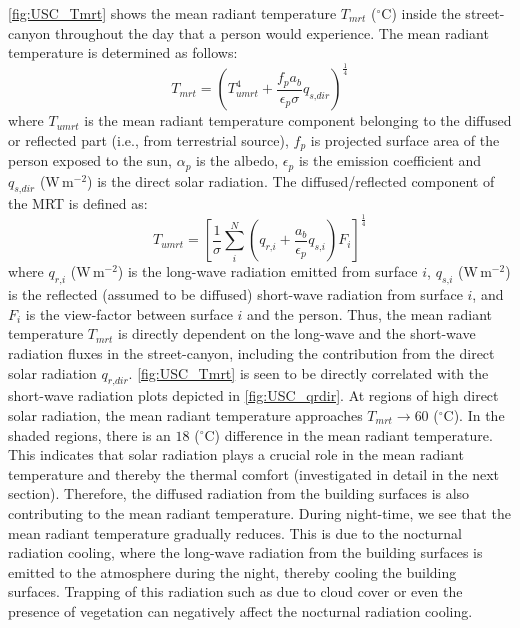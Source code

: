 \cref{fig:USC_Tmrt} shows the mean radiant temperature $T_{\textit{mrt}}$  ($^{\circ}$C) inside the street-canyon throughout the day that a person would experience.  The mean radiant temperature is determined as follows: 
\begin{equation}
T_{\textit{mrt}} = \left( T_{\textit{umrt}}^4  + \frac{f_p a_b}{\epsilon_p \sigma} q_{\textit{s,dir}} \right)^{\frac{1}{4}}
\label{eq:Tmrt2}
\end{equation}
where $T_{\textit{umrt}}$ is the mean radiant temperature component belonging to the diffused or reflected part (i.e., from terrestrial source), $f_p$ is projected surface area of the person exposed to the sun, $\alpha_p$ is the albedo, $\epsilon_p$ is the emission coefficient and $q_{\textit{s,dir}}$ (W\,m$^{-2}$) is the direct solar radiation. The diffused/reflected component of the MRT is defined as:
\begin{equation}
T_{\textit{umrt}} = \left[ \frac{1}{\sigma} \sum_{i}^N \left(q_{\textit{r,i}} + \frac{a_b}{\epsilon_p} q_{\textit{s,i}} \right)F_i\right]^{\frac{1}{4}}
\label{eq:Tumrt2}
\end{equation}
where $q_{\textit{r,i}}$ (W\,m$^{-2}$)  is the long-wave radiation emitted from surface $i$, $q_{\textit{s,i}}$ (W\,m$^{-2}$) is the reflected (assumed to be diffused) short-wave radiation from surface $i$, and $F_i$ is the view-factor between surface $i$ and the person. Thus, the mean radiant temperature $T_{\textit{mrt}}$ is directly dependent on the long-wave and the short-wave radiation fluxes in the street-canyon, including the contribution from the direct solar radiation $q_{\textit{r,dir}}$. \cref{fig:USC_Tmrt} is seen to be directly correlated with the short-wave radiation plots depicted in \cref{fig:USC_qrdir}. At regions of high direct solar radiation, the mean radiant temperature approaches $T_{\textit{mrt}}\rightarrow60$ ($^{\circ}$C). In the shaded regions, there is an $18$  ($^{\circ}$C) difference in the mean radiant temperature. This indicates that solar radiation plays a crucial role in the mean radiant temperature and thereby the thermal comfort (investigated in detail in the next section).  Therefore, the diffused radiation from the building surfaces is also contributing to the mean radiant temperature. During night-time, we see that the mean radiant temperature gradually reduces. This is due to the nocturnal radiation cooling, where the long-wave radiation from the building surfaces is emitted to the atmosphere during the night, thereby cooling the building surfaces. Trapping of this radiation such as due to cloud cover or even the presence of vegetation can negatively affect the nocturnal radiation cooling.


